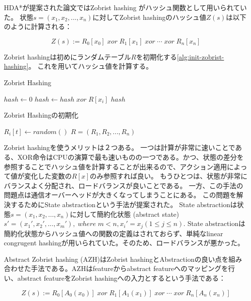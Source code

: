 HDA*が提案された論文\cite{kishimotofb13}ではZobrist hashing \cite{zobrist:70}がハッシュ関数として用いられていた。
状態$s = (x_1,x_2,...,x_n)$に対してZobrist hashingのハッシュ値$Z(s)$は以下のように計算される：

\begin{equation}
\label{eq:zobrist}
 	Z(s) := R_{0}[x_{0}]\; xor\; R_{1}[x_{1}]\; xor\; \cdots\; xor\; R_{n}[x_{n}]%
\end{equation}

Zobrist hashingは初めにランダムテーブル$R$を初期化する\ref{alg:init-zobrist-hashing}。
これを用いてハッシュ値を計算する。

\begin{algorithm}
	\caption{Zobrist Hashing}
	$hash \leftarrow 0$\;
	 {
		$hash \leftarrow hash \; xor \; R[x_i]$\;
	}
	\Return $hash$\;
	\label{alg:zobrist-hashing}
\end{algorithm}

\begin{algorithm}
	\caption{Zobrist Hashingの初期化}
	 {
		 {
			$R_i[t] \leftarrow random()$\;
		}
	}
	\Return $R = (R_1, R_2,...,R_n)$
	\label{alg:init-zobrist-hashing}
\end{algorithm}

Zobrist hashingを使うメリットは２つある。
一つは計算が非常に速いことである、XOR命令はCPUの演算で最も速いものの一つである。かつ、状態の差分を参照することでハッシュ値を計算することが出来るので、アクション適用によって値が変化した変数の$R[x]$のみ参照すれば良い。
もうひとつは、状態が非常にバランスよく分配され、ロードバランスが良いことである。
一方、この手法の問題点は通信オーバーヘッドが大きくなってしまうことにある。
この問題を解決するためにState abstractionという手法が提案された\cite{burnslrz10}。
State abstractionは状態$s = (x_1,x_2,...,x_n)$に対して簡約化状態 (abstract state) $s' = (x_1',x_2',...,x_m'), \; where \; m < n, x_i' = x_j (1 \leq j \leq n)$. %
State abstractionは簡約化状態からハッシュ値への関数の定義はされておらず、単純なlinear congrugent hashingが用いられていた。そのため、ロードバランスが悪かった。

Abstract Zobrist hashing (AZH)はZobrist hashingとAbstractionの良い点を組み合わせた手法である\cite{jinnai2016structured}。AZHはfeatureからabstract featureへのマッピングを行い、abstract featureをZobrist hashingへの入力とするという手法である：

\begin{equation}
\label{eq:abstract-zobrist}
 	Z(s) := R_{0}[A_0(x_{0})]\; xor\; R_{1}[A_1(x_{1})]\; xor\; \cdots\; xor\; R_{n}[A_n(x_{n})]%
\end{equation}

